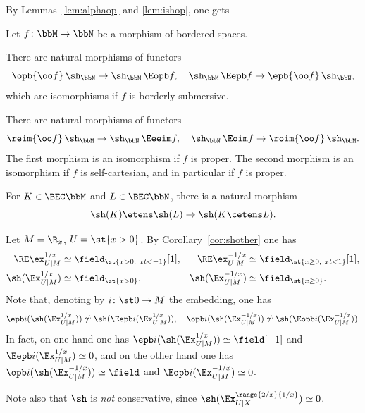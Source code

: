 By Lemmas~\ref{lem:alphaop} and \ref{lem:ishop}, one gets

\begin{lemma}\label{lem:shop}
Let $f\colon \bbM\to \bbN$ be a morphism of bordered spaces.
\begin{enumeratei}
\item\label{lem:shopi}
There are natural morphisms of functors
\[
\opb {\smash{\oo f}} \, \sh_{\bbN} \to \sh_{\bbM} \, \Eopb f, \quad
\sh_{\bbM} \, \Eepb f \to \epb {\smash{\oo f}} \, \sh_{\bbN},
\]
which are isomorphisms if $f$ is borderly submersive.
\item\label{lem:shopii}
There are natural morphisms of functors
\[
\reim{\oo f} \, \sh_{\bbM} \to \sh_{\bbN} \, \Eeeim f, \quad
\sh_{\bbN} \, \Eoim f \to \roim{\oo f} \, \sh_{\bbM}.
\]
The first morphism is an isomorphism if $f$ is proper.
The second morphism is an isomorphism if $f$ is self-cartesian,
and in particular if $f$ is proper.
\item\label{lem:shopiii}
For $K\in\BEC\bbM$ and $L\in\BEC\bbN$,
there is a natural morphism
\[
\sh(K)\etens\sh(L)\to\sh(K\cetens L).
\]
\end{enumeratei}
\end{lemma}

\begin{example}\label{exam:310}
Let $M=\R_x$, $U=\st{x>0}$.
By Corollary~\ref{cor:shother} one has
\begin{align*}
\RE\ex^{1/x}_{U|M} &\simeq \field_{\st{x>0,\ xt<-1}}[1], &
\RE\ex^{-1/x}_{U|M} &\simeq \field_{\st{x\geq0,\ xt<1}}[1], \\
\sh(\Ex^{1/x}_{U|M}) &\simeq \field_{\st{x>0}}, &
\sh(\Ex^{-1/x}_{U|M}) &\simeq \field_{\st{x\geq0}}.
\end{align*}
Note that, denoting by $i\colon\st0\to M$ the embedding, one has
\[
\epb i (\sh (\Ex^{1/x}_{U|M})) \not\simeq \sh (\Eepb i (\Ex^{1/x}_{U|M})), \quad
\opb i (\sh (\Ex^{-1/x}_{U|M})) \not\simeq \sh (\Eopb i (\Ex^{-1/x}_{U|M})).
\]
In fact, on one hand one has $\epb i (\sh (\Ex^{1/x}_{U|M}))\simeq\field[-1]$ and $\Eepb i (\Ex^{1/x}_{U|M})\simeq 0$, and on the other hand one has $\opb i (\sh (\Ex^{-1/x}_{U|M}))\simeq\field$ and $\Eopb i (\Ex^{-1/x}_{U|M})\simeq0$.

Note also that $\sh$ is \emph{not} conservative, since $\sh(\Ex_{U|X}^{\range{2/x}{1/x}})\simeq 0$.
\end{example}

